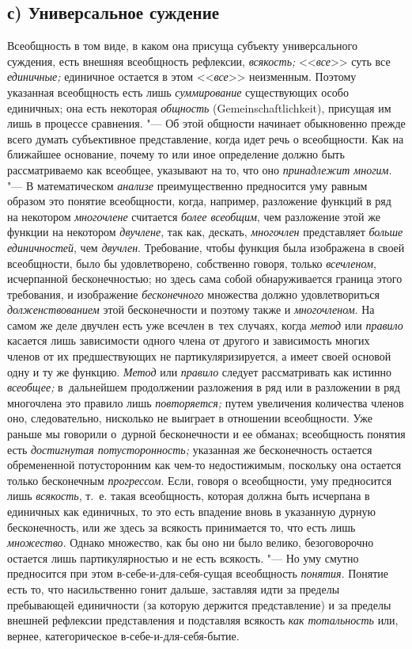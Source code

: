 \subsection[с) Универсальное суждение]{с) Универсальное суждение}

Всеобщность в том виде, в каком она присуща субъекту
универсального суждения, есть внешняя всеобщность рефлексии,
{\em всякость;} <<{\em все}>> суть все {\em единичные;}
единичное остается в этом <<{\em все}>> неизменным.
Поэтому указанная всеобщность есть лишь {\em суммирование}
существующих особо единичных; она есть некоторая
{\em общность} (Gemein\-schaft\-lich\-keit),
присущая им лишь в процессе сравнения. "--- Об
этой общности начинает обыкновенно прежде всего думать субъективное
представление, когда идет речь о всеобщности. Как на
ближайшее основание, почему то или иное определение должно быть
рассматриваемо как всеобщее, указывают на то, что оно
{\em принадлежит многим}. "--- В математическом {\em анализе}
преимущественно предносится уму равным образом это понятие
всеобщности, когда, например, разложение функций в ряд на некотором
{\em многочлене} считается {\em более всеобщим}, чем разложение этой же функции
на некотором {\em двучлене}, так как, дескать, {\em многочлен} представляет
{\em больше единичностей}, чем {\em двучлен}. Требование, чтобы функция была
изображена в своей всеобщности, было бы удовлетворено, собственно говоря,
только {\em всечленом}, исчерпанной бесконечностью; но здесь сама собой
обнаруживается граница этого требования, и изображение {\em бесконечного}
множества должно удовлетвориться {\em долженствованием} этой бесконечности и
поэтому также и {\em многочленом}. На самом же деле двучлен есть уже всечлен
в~тех случаях, когда {\em метод} или {\em правило} касается лишь зависимости
одного члена от другого и зависимость многих членов от их предшествующих не
партикуляризируется, а имеет своей основой одну и ту же функцию. {\em Метод}
или {\em правило} следует рассматривать как истинно {\em всеобщее;}
в~дальнейшем продолжении разложения в ряд или в разложении в ряд многочлена
это правило лишь {\em повторяется;} путем увеличения количества членов оно,
следовательно, нисколько не выиграет в отношении всеобщности. Уже раньше мы
говорили о~дурной бесконечности и ее обманах; всеобщность понятия есть
{\em достигнутая потусторонность;} указанная же бесконечность остается
обремененной потусторонним как чем-то недостижимым, поскольку она остается
только бесконечным {\em прогрессом}. Если, говоря о всеобщности, уму
предносится лишь {\em всякость}, т.~е. такая всеобщность, которая должна быть
исчерпана в единичных как единичных, то это есть впадение вновь в указанную
дурную бесконечность, или же здесь за всякость принимается то, что есть лишь
{\em множество}. Однако множество, как бы оно ни было велико, безоговорочно
остается лишь партикулярностью и не есть всякость. "--- Но уму смутно
предносится при этом в-себе-и-для-себя-сущая всеобщность {\em понятия}. Понятие
есть то, что насильственно гонит дальше, заставляя идти за пределы пребывающей
единичности (за которую держится представление) и за пределы внешней рефлексии
представления и подставляя всякость {\em как тотальность} или, вернее,
категорическое в-себе-и-для-себя-бытие.

